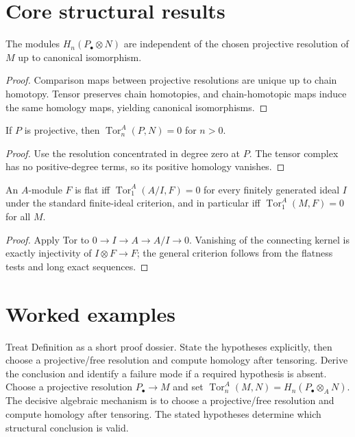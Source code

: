 \section{Core structural results}

\begin{theorem}\label{thm:v26-01}
The modules $H_n(P_\bullet\otimes N)$ are independent of the chosen projective resolution of $M$ up to canonical isomorphism.
\begin{proof}
Comparison maps between projective resolutions are unique up to chain homotopy. Tensor preserves chain homotopies, and chain-homotopic maps induce the same homology maps, yielding canonical isomorphisms.
\end{proof}
\end{theorem}

\begin{theorem}\label{thm:v26-02}
If $P$ is projective, then $\operatorname{Tor}_n^A(P,N)=0$ for $n>0$.
\begin{proof}
Use the resolution concentrated in degree zero at $P$. The tensor complex has no positive-degree terms, so its positive homology vanishes.
\end{proof}
\end{theorem}

\begin{theorem}\label{thm:v26-03}
An $A$-module $F$ is flat iff $\operatorname{Tor}_1^A(A/I,F)=0$ for every finitely generated ideal $I$ under the standard finite-ideal criterion, and in particular iff $\operatorname{Tor}_1^A(M,F)=0$ for all $M$.
\begin{proof}
Apply Tor to $0\to I\to A\to A/I\to0$. Vanishing of the connecting kernel is exactly injectivity of $I\otimes F\to F$; the general criterion follows from the flatness tests and long exact sequences.
\end{proof}
\end{theorem}

\section{Worked examples}

\begin{example}\label{ex:v26-worked-01}
Treat Definition as a short proof dossier. State the hypotheses explicitly, then choose a projective/free resolution and compute homology after tensoring. Derive the conclusion and identify a failure mode if a required hypothesis is absent. Choose a projective resolution $P_\bullet\to M$ and set $\operatorname{Tor}_n^A(M,N)=H_n(P_\bullet\otimes_A N)$. The decisive algebraic mechanism is to choose a projective/free resolution and compute homology after tensoring. The stated hypotheses determine which structural conclusion is valid.
\end{example}

